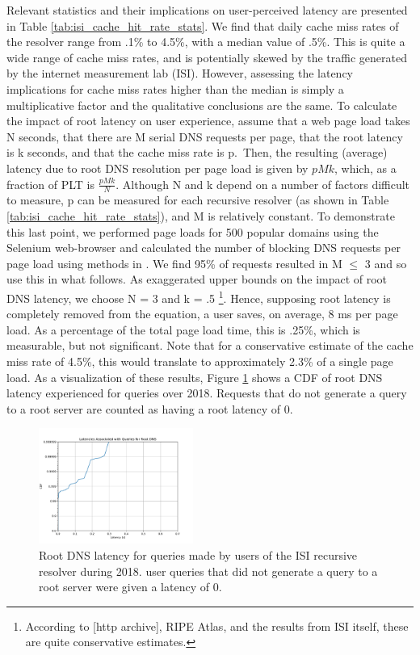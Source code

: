 \documentclass[sigconf,nonacm,10pt]{acmart}
\begin{document}
Relevant statistics and their implications on user-perceived latency are
presented in Table \ref{tab:isi_cache_hit_rate_stats}. We find that
daily cache miss rates of the resolver range from .1\% to 4.5\%, with a
median value of .5\%. This is quite a wide range of cache miss rates,
and is potentially skewed by the traffic generated by the internet
measurement lab (ISI). However, assessing the latency implications for
cache miss rates higher than the median is simply a multiplicative
factor and the qualitative conclusions are the same. \break \break
To calculate the impact of root latency on user experience, assume that
a web page load takes N seconds, that there are M serial DNS requests
per page, that the root latency is k seconds, and that the cache miss
rate is p.~Then, the resulting (average) latency due to root DNS
resolution per page load is given by \(pMk\), which, as a fraction of
PLT is \(\frac{p M k}{N}\). \break \break
Although N and k depend on a number of factors difficult to measure, p
can be measured for each recursive resolver (as shown in Table
\ref{tab:isi_cache_hit_rate_stats}), and M is relatively constant. To
demonstrate this last point, we performed page loads for 500 popular
domains using the Selenium web-browser and calculated the number of
blocking DNS requests per page load using methods in
\cite{sundaresan2013web}. We find 95\% of requests resulted in M
\(\leq\) 3 and so use this in what follows. \break
As exaggerated upper bounds on the impact of root DNS latency, we choose
N = 3 and k = .5
\footnote{ According to [http archive], RIPE Atlas, and the results from ISI itself, these are quite conservative estimates. }.
Hence, supposing root latency is completely removed from the equation, a
user saves, on average, 8 ms per page load. As a percentage of the total
page load time, this is .25\%, which is measurable, but not significant.
Note that for a conservative estimate of the cache miss rate of 4.5\%,
this would translate to approximately 2.3\% of a single page load.
\break \break
As a visualization of these results, Figure
\ref{fig:isi_root_dns_latency} shows a CDF of root DNS latency
experienced for queries over 2018. Requests that do not generate a query
to a root server are counted as having a root latency of 0.

\begin{figure}
    \centering
    \includegraphics[width=0.45\textwidth]{figures/isi_root_dns_latency.pdf}
    \caption{Root DNS latency for queries made by users of the ISI recursive resolver during 2018. user queries that did not generate a query to a root server were given a latency of 0. }
    \label{fig:isi_root_dns_latency}
\end{figure}
\end{document}

